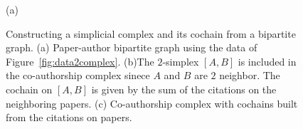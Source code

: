 \begin{figure}[htpb]
%
\settowidth{\tempwidth}{\usebox{\tempbox}}%
\hfil\begin{minipage}[b]{\tempwidth}%
\raisebox{-\height}{\usebox{\tempbox}}%
\scriptsize{\caption*{(a)}}%
\end{minipage}%
%
\settowidth{\tempwidth}{\usebox{\tempbox}}%
\hfil\begin{minipage}[b]{\tempwidth}%
\raisebox{-\height}{\usebox{\tempbox}}%
\scriptsize{}%
\end{minipage}%
\vspace{5pt}
\settowidth{\tempwidth}{\usebox{\tempbox}}%
\hfil\begin{minipage}[b]{\tempwidth}%
\raisebox{-\height}{\usebox{\tempbox}}%
\scriptsize{}%
\end{minipage}%
\caption{Constructing a simplicial complex and its cochain from a bipartite graph. (a) Paper-author bipartite graph using the data of Figure~\ref{fig:data2complex}. (b)The $2$-simplex $[A,B]$ is included in the co-authorship complex sinece $A$ and $B$ are $2$ neighbor. The cochain on $[A,B]$ is given by the sum of the citations on the neighboring papers. (c) Co-authorship complex with cochains built from the citations on papers.}\label{fig:bipartite}
\end{figure}

